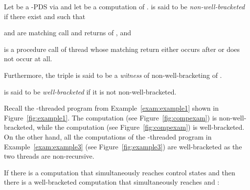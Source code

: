 \documentclass{LMCS}
\begin{document}
\begin{definition}
Let  be a -PDS via  and let  be a computation of .  is said to be  \emph{non-well-bracketed} if there exist  and  such that
\begin{iteMize}{}
\item   and  are matching call and returns of
, and
\item   is a procedure call of thread  whose matching return either occurs after  or does not occur at all.
\end{iteMize}
Furthermore,
the triple  is said to be a {\it witness} of non-well-bracketing of .

 is said to be \emph{well-bracketed} if it is not non-well-bracketed.
\end{definition}
\begin{example}
\label{exam:example4}
Recall the -threaded program from Example~\ref{exam:example1} shown in Figure~\ref{fig:example1}.
The computation  (see Figure~\ref{fig:compexam}) is non-well-bracketed, while the computation 
(see Figure~\ref{fig:compexam}) is well-bracketed. On the other hand, all the computations of the -threaded program
in  Example~\ref{exam:example3} (see Figure~\ref{fig:example3}) are well-bracketed as the two threads are
non-recursive.
\end{example}
 If there is a computation that simultaneously reaches
control states  and    then there is a well-bracketed computation that simultaneously reaches
 and :
\end{document}
